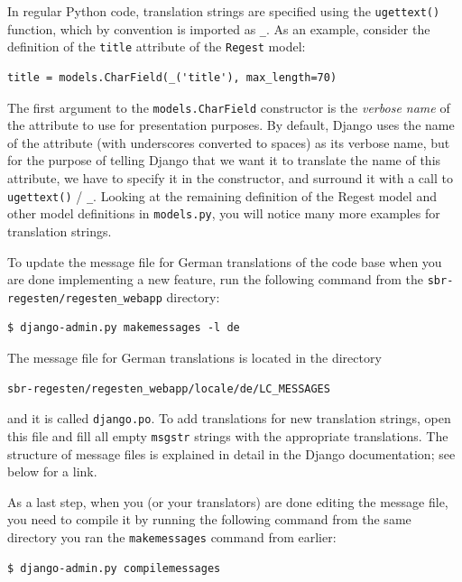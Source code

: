 In regular Python code, translation strings are specified using the
\texttt{ugettext()} function, which by convention is imported as
\texttt{\_}. As an example, consider the definition of the
\texttt{title} attribute of the \texttt{Regest} model:

\begin{verbatim}
title = models.CharField(_('title'), max_length=70)
\end{verbatim}

The first argument to the \texttt{models.CharField} constructor is the
\emph{verbose name} of the attribute to use for presentation purposes.
By default, Django uses the name of the attribute (with underscores
converted to spaces) as its verbose name, but for the purpose of
telling Django that we want it to translate the name of this
attribute, we have to specify it in the constructor, and surround it
with a call to \texttt{ugettext()} / \texttt{\_}. Looking at the
remaining definition of the Regest model and other model definitions
in \texttt{models.py}, you will notice many more examples for
translation strings.

To update the message file for German translations of the code base
when you are done implementing a new feature, run the following
command from the \texttt{sbr-regesten/regesten\_webapp} directory:

\begin{verbatim}
$ django-admin.py makemessages -l de
\end{verbatim}

The message file for German translations is located in the directory

\begin{verbatim}
sbr-regesten/regesten_webapp/locale/de/LC_MESSAGES
\end{verbatim}

and it is called \texttt{django.po}. To add translations for new
translation strings, open this file and fill all empty \texttt{msgstr}
strings with the appropriate translations. The structure of message
files is explained in detail in the Django documentation; see below
for a link.

As a last step, when you (or your translators) are done editing the
message file, you need to compile it by running the following command
from the same directory you ran the \texttt{makemessages} command from
earlier:

\begin{verbatim}
$ django-admin.py compilemessages
\end{verbatim}

